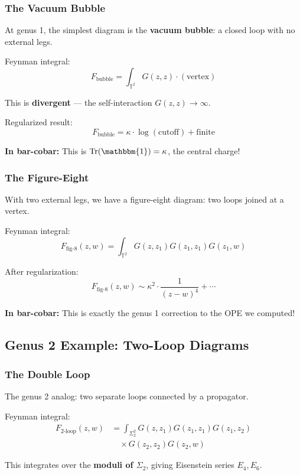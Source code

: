 \subsubsection{The Vacuum Bubble}

At genus 1, the simplest diagram is the \textbf{vacuum bubble}: a closed loop with no external legs.

Feynman integral:
$$F_{\text{bubble}} = \int_{\mathbb{T}^2} G(z, z) \cdot (\text{vertex})$$

This is \textbf{divergent} --- the self-interaction $G(z,z) \to \infty$.

Regularized result:
$$F_{\text{bubble}} = \kappa \cdot \log(\text{cutoff}) + \text{finite}$$

\textbf{In bar-cobar:} This is $\operatorname{Tr}(\mathbbm{1}) = \kappa$, the central charge!

\subsubsection{The Figure-Eight}

With two external legs, we have a figure-eight diagram: two loops joined at a vertex.

Feynman integral:
$$F_{\text{fig-8}}(z, w) = \int_{\mathbb{T}^2} G(z, z_1) G(z_1, z_1) G(z_1, w)$$

After regularization:
$$F_{\text{fig-8}}(z, w) \sim \kappa^2 \cdot \frac{1}{(z-w)^4} + \cdots$$

\textbf{In bar-cobar:} This is exactly the genus 1 correction to the OPE we computed!

\subsection{Genus 2 Example: Two-Loop Diagrams}

\subsubsection{The Double Loop}

The genus 2 analog: two separate loops connected by a propagator.

Feynman integral:
\begin{align}
F_{2\text{-loop}}(z, w) &= \int_{\Sigma_2^2} G(z, z_1) G(z_1, z_1) G(z_1, z_2) \\
&\quad \times G(z_2, z_2) G(z_2, w)
\end{align}

This integrates over the \textbf{moduli of $\Sigma_2$}, giving Eisenstein series $E_4, E_6$.

